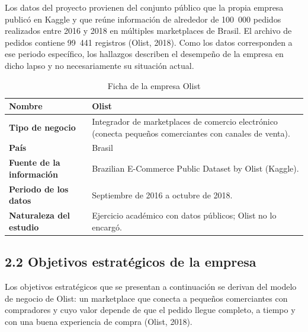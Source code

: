 \documentclass[a4paper,stu,12pt,donotrepeattitle,floatsintext]{apa7}
\begin{document}
Los datos del proyecto provienen del conjunto público que la propia empresa publicó en Kaggle y que reúne información de alrededor de 100~000 pedidos realizados entre 2016 y 2018 en múltiples marketplaces de Brasil. El archivo de pedidos contiene 99~441 registros (Olist, 2018). Como los datos corresponden a ese periodo específico, los hallazgos describen el desempeño de la empresa en dicho lapso y no necesariamente su situación actual.

{\footnotesize
\begin{longtable}{|>{\raggedright\arraybackslash}p{}|>{\raggedright\arraybackslash}p{}|}
\caption{Ficha de la empresa Olist}\\
\hline
\textbf{Nombre} & Olist \\ \hline
\textbf{Tipo de negocio} & Integrador de marketplaces de comercio electrónico (conecta pequeños comerciantes con canales de venta). \\ \hline
\textbf{País} & Brasil \\ \hline
\textbf{Fuente de la información} & Brazilian E-Commerce Public Dataset by Olist (Kaggle). \\ \hline
\textbf{Periodo de los datos} & Septiembre de 2016 a octubre de 2018. \\ \hline
\textbf{Naturaleza del estudio} & Ejercicio académico con datos públicos; Olist no lo encargó. \\ \hline
\end{longtable}
}
\subsection{2.2 Objetivos estratégicos de la empresa}
Los objetivos estratégicos que se presentan a continuación se derivan del modelo de negocio de Olist: un marketplace que conecta a pequeños comerciantes con compradores y cuyo valor depende de que el pedido llegue completo, a tiempo y con una buena experiencia de compra (Olist, 2018).
\end{document}
